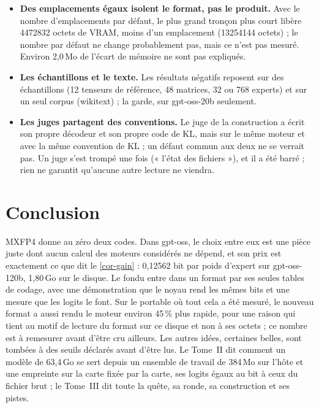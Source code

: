 \documentclass[11pt, a4paper]{article}
\theoremstyle{remark}
\begin{document}
\begin{itemize}
\item \textbf{Des emplacements égaux isolent le format, pas le produit.} Avec le nombre d'emplacements par défaut, le plus grand tronçon plus court libère \num{4472832} octets de VRAM, moins d'un emplacement (\num{13254144} octets) ; le nombre par défaut ne change probablement pas, mais ce n'est pas mesuré. Environ 2,0\,Mo de l'écart de mémoire ne sont pas expliqués.
\item \textbf{Les échantillons et le texte.} Les résultats négatifs reposent sur des échantillons (12 tenseurs de référence, 48 matrices, 32 ou 768 experts) et sur un seul corpus (wikitext) ; la garde, sur gpt-oss-20b seulement.
\item \textbf{Les juges partagent des conventions.} Le juge de la construction a écrit son propre décodeur et son propre code de KL, mais sur le même moteur et avec la même convention de KL ; un défaut commun aux deux ne se verrait pas. Un juge s'est trompé une fois (« l'état des fichiers »), et il a été barré ; rien ne garantit qu'aucune autre lecture ne viendra.
\end{itemize}

\section{Conclusion}\label{sec-conclusion}

MXFP4 donne au zéro deux codes. Dans gpt-oss, le choix entre eux est une pièce juste dont aucun calcul des moteurs considérés ne dépend, et son prix est exactement ce que dit le \cref{cor-gain} : 0,12562 bit par poids d'expert sur gpt-oss-120b, 1,80\,Go sur le disque. Le fondu entre dans un format par ses seules tables de codage, avec une démonstration que le noyau rend les mêmes bits et une mesure que les logits le font. Sur le portable où tout cela a été mesuré, le nouveau format a aussi rendu le moteur environ 45\,\% plus rapide, pour une raison qui tient au motif de lecture du format sur ce disque et non à ses octets ; ce nombre est à remesurer avant d'être cru ailleurs. Les autres idées, certaines belles, sont tombées à des seuils déclarés avant d'être lus. Le Tome~II dit comment un modèle de 63,4\,Go se sert depuis un ensemble de travail de 384\,Mo sur l'hôte et une empreinte sur la carte fixée par la carte, ses logits égaux au bit à ceux du fichier brut ; le Tome~III dit toute la quête, sa ronde, sa construction et ses pistes.
\end{document}
